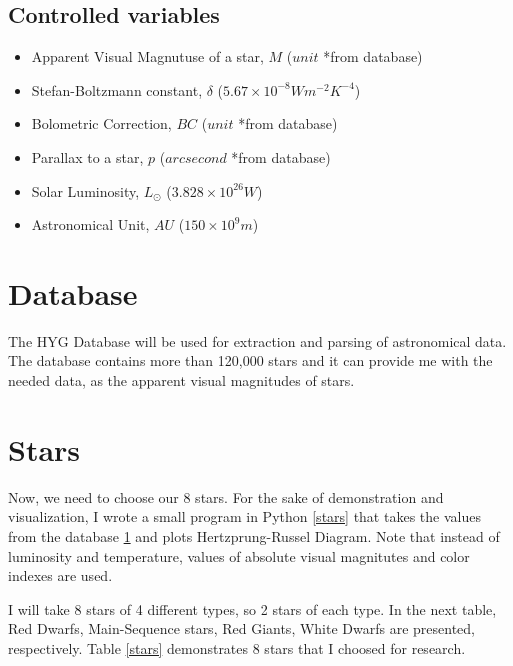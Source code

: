 \documentclass[a4paper]{IEEEtran}
\begin{document}
  \subsection{Controlled variables}

  \begin{itemize}

    \item Apparent Visual Magnutuse of a star, $M$ ($unit$ *from database)

    \item Stefan-Boltzmann constant, $\delta$ ($5.67 \times 10^{-8} W m^{-2} K^{-4}$)

    \item Bolometric Correction, $BC$ ($unit$ *from database)

    \item Parallax to a star, $p$ ($arcsecond$ *from database)

    \item Solar Luminosity, $L_{\odot}$ ($3.828 \times 10^{26}W$)

    \item Astronomical Unit, $AU$ ($150 \times 10^{9}m$)
      
    \end{itemize}


  \section{Database}
  \label{database}
  The HYG Database \cite{hyg} will be used for extraction and parsing of astronomical data. The database contains more than 120,000 stars and it can provide me with the needed data, as the apparent visual magnitudes of stars. 

  \section{Stars}

  Now, we need to choose our 8 stars. For the sake of demonstration and visualization, I wrote a small program in Python \ref{stars} that takes the values from the database \ref{database} and plots Hertzprung-Russel Diagram. Note that instead of luminosity and temperature, values of absolute visual magnitutes and color indexes are used.

  I will take 8 stars of 4 different types, so 2 stars of each type. In the next table, Red Dwarfs, Main-Sequence stars, Red Giants, White Dwarfs are presented, respectively. Table \ref{stars} demonstrates 8 stars that I choosed for research.
\end{document}
